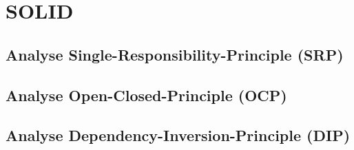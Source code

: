 \chapter{SOLID}

\section{Analyse Single-Responsibility-Principle (SRP)}

\section{Analyse Open-Closed-Principle (OCP)}

\section{Analyse Dependency-Inversion-Principle (DIP)}